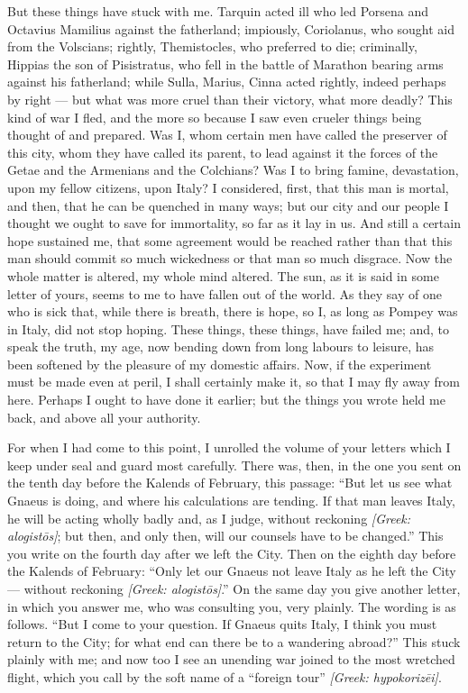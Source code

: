  But these things have stuck with me. Tarquin acted ill who led Porsena and Octavius Mamilius against the fatherland; impiously, Coriolanus, who sought aid from the Volscians; rightly, Themistocles, who preferred to die; criminally, Hippias the son of Pisistratus, who fell in the battle of Marathon bearing arms against his fatherland; while Sulla, Marius, Cinna acted rightly, indeed perhaps by right --- but what was more cruel than their victory, what more deadly? This kind of war I fled, and the more so because I saw even crueler things being thought of and prepared. Was I, whom certain men have called the preserver of this city, whom they have called its parent, to lead against it the forces of the Getae and the Armenians and the Colchians? Was I to bring famine, devastation, upon my fellow citizens, upon Italy? I considered, first, that this man is mortal, and then, that he can be quenched in many ways; but our city and our people I thought we ought to save for immortality, so far as it lay in us. And still a certain hope sustained me, that some agreement would be reached rather than that this man should commit so much wickedness or that man so much disgrace. Now the whole matter is altered, my whole mind altered. The sun, as it is said in some letter of yours, seems to me to have fallen out of the world. As they say of one who is sick that, while there is breath, there is hope, so I, as long as Pompey was in Italy, did not stop hoping. These things, these things, have failed me; and, to speak the truth, my age, now bending down from long labours to leisure, has been softened by the pleasure of my domestic affairs. Now, if the experiment must be made even at peril, I shall certainly make it, so that I may fly away from here. Perhaps I ought to have done it earlier; but the things you wrote held me back, and above all your authority.

 For when I had come to this point, I unrolled the volume of your letters which I keep under seal and guard most carefully. There was, then, in the one you sent on the tenth day before the Kalends of February, this passage: ``But let us see what Gnaeus is doing, and where his calculations are tending. If that man leaves Italy, he will be acting wholly badly and, as I judge, without reckoning \textit{[Greek: alogist\=os]}; but then, and only then, will our counsels have to be changed.'' This you write on the fourth day after we left the City. Then on the eighth day before the Kalends of February: ``Only let our Gnaeus not leave Italy as he left the City --- without reckoning \textit{[Greek: alogist\=os]}.'' On the same day you give another letter, in which you answer me, who was consulting you, very plainly. The wording is as follows. ``But I come to your question. If Gnaeus quits Italy, I think you must return to the City; for what end can there be to a wandering abroad?'' This stuck plainly with me; and now too I see an unending war joined to the most wretched flight, which you call by the soft name of a ``foreign tour'' \textit{[Greek: hypokoriz\=ei]}.

